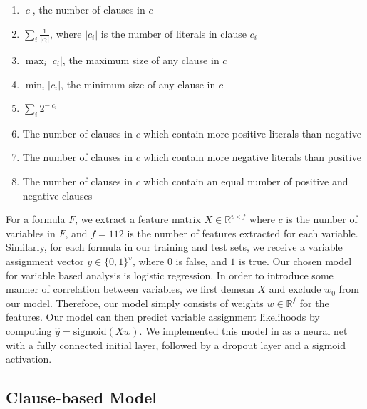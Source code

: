 \documentclass{article}
\begin{document}
\begin{enumerate}
    \item $\lvert c \rvert$, the number of clauses in $c$
    \item $\sum_i \frac{1}{\lvert c_i \rvert}$, where $\lvert c_i \rvert$ is the number of literals in clause $c_i$
    \item $\max_i \lvert c_i \rvert$, the maximum size of any clause in $c$
    \item $\min_i \vert c_i \rvert$, the minimum size of any clause in $c$
    \item $\sum_i 2^{-\lvert c_i \rvert}$
    \item The number of clauses in $c$ which contain more positive literals than negative
    \item The number of clauses in $c$ which contain more negative literals than positive
    \item The number of clauses in $c$ which contain an equal number of positive and negative clauses
\end{enumerate}


For a formula $F$, we extract a feature matrix $X \in \mathbb{R}^{v \times
f}$ where $c$ is the number of variables in $F$, and $f = 112$ is the number of
features extracted for each variable. Similarly, for each formula in our
training and test sets, we receive a variable assignment vector $y \in \{0,
1\}^v$, where $0$ is false, and $1$ is true. Our chosen model for variable based
analysis is logistic regression. In order to introduce some manner of
correlation between variables, we first demean $X$ and exclude $w_0$ from our
model. Therefore, our model simply consists of weights $w \in \mathbb{R}^f$ for
the features. Our model can then predict variable assignment likelihoods by
computing $\widehat{y} = \text{sigmoid}(Xw)$. We implemented this model in as a
neural net with a fully connected initial layer, followed by a dropout layer and
a sigmoid activation.

\subsection*{Clause-based Model}
\end{document}
